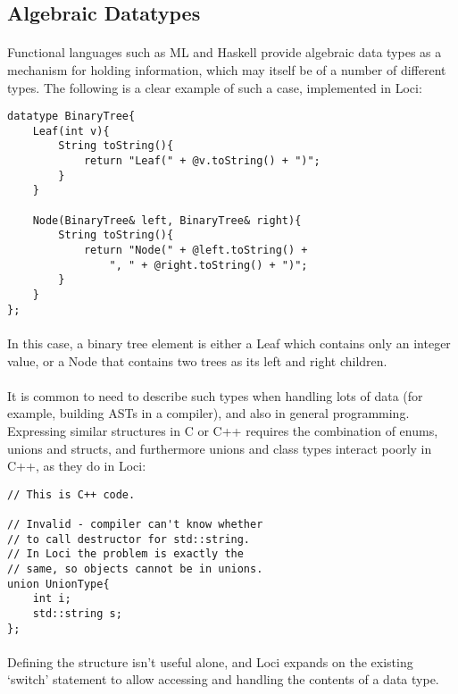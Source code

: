 \documentclass[12pt,twoside,notitlepage]{report}
\begin{document}
\clearpage

\subsection{Algebraic Datatypes}

\paragraph{}
Functional languages such as ML and Haskell provide algebraic data types as a mechanism for holding information, which may itself be of a number of different types. The following is a clear example of such a case, implemented in Loci:


\begin{lstlisting}
datatype BinaryTree{
	Leaf(int v){
		String toString(){
			return "Leaf(" + @v.toString() + ")";
		}
	}
	
	Node(BinaryTree& left, BinaryTree& right){
		String toString(){
			return "Node(" + @left.toString() +
				", " + @right.toString() + ")";
		}
	}
};
\end{lstlisting}


\paragraph{}
In this case, a binary tree element is either a Leaf which contains only an integer value, or a Node that contains two trees as its left and right children.

\paragraph{}
It is common to need to describe such types when handling lots of data (for example, building ASTs in a compiler), and also in general programming. Expressing similar structures in C or C++ requires the combination of enums, unions and structs, and furthermore unions and class types interact poorly in C++, as they do in Loci:

\begin{lstlisting}
// This is C++ code.

// Invalid - compiler can't know whether
// to call destructor for std::string.
// In Loci the problem is exactly the
// same, so objects cannot be in unions.
union UnionType{
	int i;
	std::string s;
};
\end{lstlisting}

\paragraph{}
Defining the structure isn't useful alone, and Loci expands on the existing `switch' statement to allow accessing and handling the contents of a data type.
\end{document}
